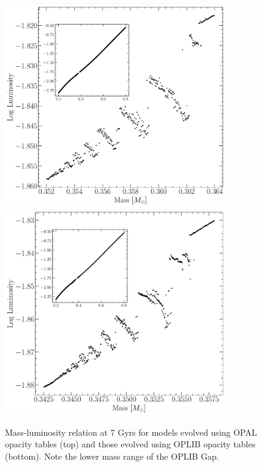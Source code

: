 \begin{figure}
	\centering
	\includegraphics[width=0.85\textwidth]{figures/jaoOpacity/OPALPunchIn.pdf}
	\includegraphics[width=0.85\textwidth]{figures/jaoOpacity/OPLIBPunchIn.pdf}
	\caption{Mass-luminosity relation at 7 Gyrs for models evolved using OPAL opacity
	tables (top) and those evolved using OPLIB opacity tables (bottom). Note
	the lower mass range of the OPLIB Gap.}
	\label{fig:PunchIn}
		
\end{figure}

